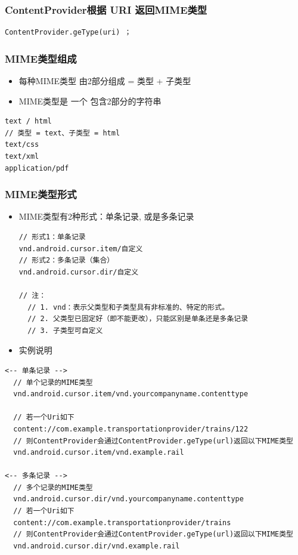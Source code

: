 \documentclass[9pt, b5paper]{article}
\begin{document}
\subsubsection{ContentProvider根据 URI 返回MIME类型}
\label{sec-1-2-1}
\begin{verbatim}
ContentProvider.geType(uri) ；
\end{verbatim}
\subsubsection{MIME类型组成}
\label{sec-1-2-2}
\begin{itemize}
\item 每种MIME类型 由2部分组成 = 类型 + 子类型
\item MIME类型是 一个 包含2部分的字符串
\end{itemize}
\begin{verbatim}
text / html
// 类型 = text、子类型 = html
text/css
text/xml
application/pdf
\end{verbatim}

\subsubsection{MIME类型形式}
\label{sec-1-2-3}
\begin{itemize}
\item MIME类型有2种形式：单条记录, 或是多条记录
\begin{verbatim}
// 形式1：单条记录  
vnd.android.cursor.item/自定义
// 形式2：多条记录（集合）
vnd.android.cursor.dir/自定义 

// 注：
  // 1. vnd：表示父类型和子类型具有非标准的、特定的形式。
  // 2. 父类型已固定好（即不能更改），只能区别是单条还是多条记录
  // 3. 子类型可自定义
\end{verbatim}
\item 实例说明
\end{itemize}
\begin{verbatim}
<-- 单条记录 -->
  // 单个记录的MIME类型
  vnd.android.cursor.item/vnd.yourcompanyname.contenttype 

  // 若一个Uri如下
  content://com.example.transportationprovider/trains/122   
  // 则ContentProvider会通过ContentProvider.geType(url)返回以下MIME类型
  vnd.android.cursor.item/vnd.example.rail

<-- 多条记录 -->
  // 多个记录的MIME类型
  vnd.android.cursor.dir/vnd.yourcompanyname.contenttype 
  // 若一个Uri如下
  content://com.example.transportationprovider/trains 
  // 则ContentProvider会通过ContentProvider.geType(url)返回以下MIME类型
  vnd.android.cursor.dir/vnd.example.rail
\end{verbatim}
\end{document}
